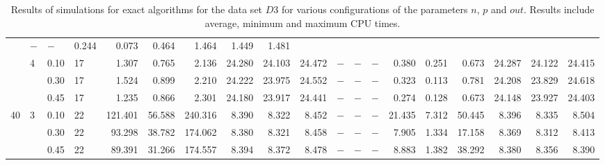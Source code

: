 \documentclass[thesis=B,english]{FITthesis}[2012/10/20]
\begin{document}
\begin{table}[h!]
\begin{adjustbox}{angle=90}
{\begin{tabular}{l|l|l|l|r|r|r|r|r|r|r|r|r|r|r|r|r|r|r|}
&     $-$ &     $-$ &       0.244 &  0.073 &   0.464 &       1.464 &   1.449 &   1.481 \\   & 4 & 0.10 & 17 &    1.307 &   0.765 &    2.136 &  24.280 &  24.103 &  24.472 &     $-$ &     $-$ &     $-$ &       0.380 &  0.251 &   0.673 &      24.287 &  24.122 &  24.415 \\   &   & 0.30 & 17 &    1.524 &   0.899 &    2.210 &  24.222 &  23.975 &  24.552 &     $-$ &     $-$ &     $-$ &       0.323 &  0.113 &   0.781 &      24.208 &  23.829 &  24.618 \\   &   & 0.45 & 17 &    1.235 &   0.866 &    2.301 &  24.180 &  23.917 &  24.441 &     $-$ &     $-$ &     $-$ &       0.274 &  0.128 &   0.673 &      24.148 &  23.927 &  24.403 \\40 & 3 & 0.10 & 22 &  121.401 &  56.588 &  240.316 &   8.390 &   8.322 &   8.452 &     $-$ &     $-$ &     $-$ &      21.435 &  7.312 &  50.445 &       8.396 &   8.335 &   8.504 \\   &   & 0.30 & 22 &   93.298 &  38.782 &  174.062 &   8.380 &   8.321 &   8.458 &     $-$ &     $-$ &     $-$ &       7.905 &  1.334 &  17.158 &       8.369 &   8.312 &   8.413 \\   &   & 0.45 & 22 &   89.391 &  31.266 &  174.557 &   8.394 &   8.372 &   8.478 &     $-$ &     $-$ &     $-$ &       8.883 &  1.382 &  38.292 &       8.380 &   8.356 &   8.390 \\
			 \hline 
			\end{tabular} 
			
			
			
			}
			
\end{adjustbox}
    
    \caption{Results of simulations for exact algorithms for the data set $D3$ for various configurations of the parameters $n$, $p$ and $out$. Results include average, minimum and maximum CPU times.}
    \label{table:exact:3}
\end{table}








\end{document}

